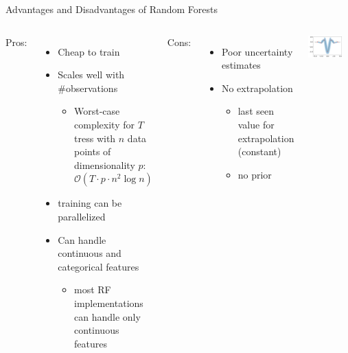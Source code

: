 \begin{frame}[c,fragile]{Advantages and Disadvantages of Random Forests}


\begin{columns}
Pros:
\begin{itemize}
\item Cheap to train
\item Scales well with \#observations
\begin{itemize}
	\item Worst-case complexity for $T$ tress with $n$ data points of dimensionality $p$: $\mathcal O(T\cdot p \cdot n^2 \log{n})$
\end{itemize}
\item training can be parallelized
\item Can handle continuous and categorical features
\begin{itemize}
	\item most RF implementations can handle only continuous features
\end{itemize}
\end{itemize}

Cons:
\begin{itemize}
\item Poor uncertainty estimates
\item No extrapolation
	\begin{itemize}
		\item last seen value for extrapolation (constant)
		\item no prior
	\end{itemize}
\end{itemize}

\includegraphics[width=0.8\textwidth]{images/rf_noboot_rand_split.png}

\end{columns}

\end{frame}
